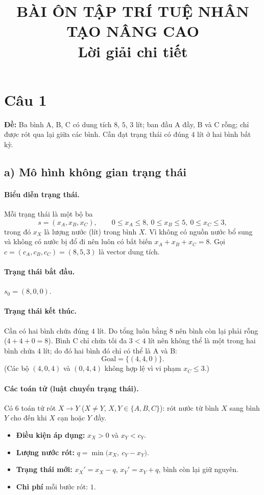 \documentclass[a4paper,11pt]{article}
\title{\textbf{BÀI ÔN TẬP TRÍ TUỆ NHÂN TẠO NÂNG CAO}\\[2pt]\large Lời giải chi tiết}
\author{}
\date{}
\newcommand{\cm}{,\allowbreak\ }
\newcommand{\cau}[1]{\section*{Câu #1}\addcontentsline{toc}{section}{Câu #1}}
\begin{document}
\maketitle

\cau{1}
\textbf{Đề:} Ba bình A, B, C có dung tích $8$, $5$, $3$ lít; ban đầu A đầy, B và C rỗng; chỉ được rót qua lại giữa các bình. Cần đạt trạng thái có đúng $4$ lít ở hai bình bất kỳ.

\subsection*{a) Mô hình không gian trạng thái}

\paragraph{Biểu diễn trạng thái.} Mỗi trạng thái là một bộ ba
\[
s=(x_A,x_B,x_C),\qquad 0\le x_A\le 8\cm 0\le x_B\le 5\cm 0\le x_C\le 3,
\]
trong đó $x_X$ là lượng nước (lít) trong bình $X$. Vì không có nguồn nước bổ sung và không có nước bị đổ đi nên luôn có bất biến
$x_A+x_B+x_C=8$. Gọi $c=(c_A,c_B,c_C)=(8,5,3)$ là vector dung tích.

\paragraph{Trạng thái bắt đầu.} $s_0=(8,0,0)$.

\paragraph{Trạng thái kết thúc.} Cần có hai bình chứa đúng $4$ lít. Do tổng luôn bằng $8$ nên bình còn lại phải rỗng ($4+4+0=8$). Bình C chỉ chứa tối đa $3<4$ lít nên không thể là một trong hai bình chứa $4$ lít; do đó hai bình đó chỉ có thể là A và B:
\[
\mathrm{Goal}=\{(4,4,0)\}.
\]
(Các bộ $(4,0,4)$ và $(0,4,4)$ không hợp lệ vì vi phạm $x_C\le 3$.)

\paragraph{Các toán tử (luật chuyển trạng thái).} Có $6$ toán tử rót $X\to Y$ ($X\neq Y$, $X,Y\in\{A,B,C\}$): rót nước từ bình $X$ sang bình $Y$ cho đến khi $X$ cạn hoặc $Y$ đầy.
\begin{itemize}[nosep]
  \item \textbf{Điều kiện áp dụng:} $x_X>0$ và $x_Y<c_Y$.
  \item \textbf{Lượng nước rót:} $q=\min\bigl(x_X\cm c_Y-x_Y\bigr)$.
  \item \textbf{Trạng thái mới:} $x_X'=x_X-q$, $x_Y'=x_Y+q$, bình còn lại giữ nguyên.
  \item \textbf{Chi phí} mỗi bước rót: $1$.
\end{itemize}
\end{document}
